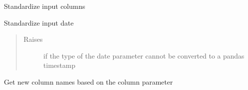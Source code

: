 \documentclass[letterpaper,10pt,english]{sphinxmanual}
\begin{document}
\begin{fulllineitems}
\label{\detokenize{dalio.util:dalio.util.processing_utils.list_str}}
\end{fulllineitems}


\begin{fulllineitems}
\label{\detokenize{dalio.util:dalio.util.processing_utils.process_cols}}
Standardize input columns

\end{fulllineitems}


\begin{fulllineitems}
\label{\detokenize{dalio.util:dalio.util.processing_utils.process_date}}
Standardize input date
\begin{quote}\begin{description}
\item[{Raises}] \leavevmode
{} \textendash{} if the type of the date parameter cannot be converted to
    a pandas timestamp

\end{description}\end{quote}

\end{fulllineitems}


\begin{fulllineitems}
\label{\detokenize{dalio.util:dalio.util.processing_utils.process_new_colnames}}
Get new column names based on the column parameter

\end{fulllineitems}
\end{document}
